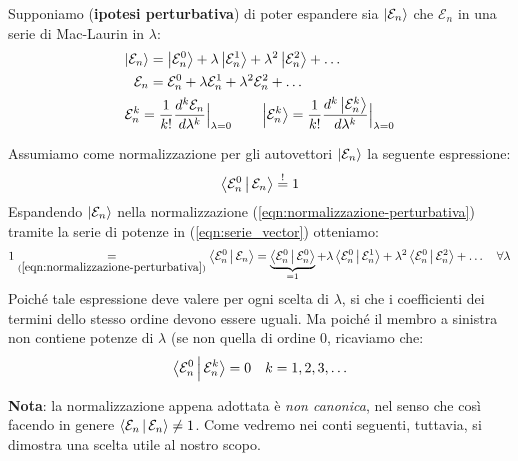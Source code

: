 \documentclass[../../FisicaTeorica.tex]{subfiles}
\begin{document}
Supponiamo (\textbf{ipotesi perturbativa}) di poter espandere sia $\Ket{\mathcal{E}_n}$ che $\mathcal{E}_n$ in una serie di Mac-Laurin in $\lambda$:
\begin{align}
\ket{\mathcal{E}_n} &= \ket{\mathcal{E}^0_n} + \lambda \ket{\mathcal{E}^1_n} + \lambda^2 \ket{\mathcal{E}^2_n} + \dots \label{eqn:serie_vector}\\
\mathcal{E}_n &= \mathcal{E}^0_n + \lambda \mathcal{E}^1_n + \lambda^2 \mathcal{E}^2_n +\dots \label{eqn:serie_evalue}\\
\nonumber
\mathcal{E}_n^k =\frac{1}{k!} \frac{d^k \mathcal{E}_n}{d\lambda^k}\Big|_{\lambda=0}\span \qquad \ket{\mathcal{E}_n^k}=\frac{1}{k!}\frac{d^k\ket{\mathcal{E}_n^k}}{d\lambda^k}\Big|_{\lambda=0}
\end{align}

Assumiamo come normalizzazione per gli autovettori $\Ket{\mathcal{E}_n}$ la seguente espressione:
\begin{align}
\Braket{\mathcal{E}^0_n|\mathcal{E}_n} \overset{!}{=} 1
\label{eqn:normalizzazione-perturbativa}
\end{align} 
Espandendo $\Ket{\mathcal{E}_n}$ nella normalizzazione (\ref{eqn:normalizzazione-perturbativa}) tramite la serie di potenze in (\ref{eqn:serie_vector}) otteniamo:
\begin{align*}
1 \underset{(\ref{eqn:normalizzazione-perturbativa})} =
\Braket{\mathcal{E}^0_n | \mathcal{E}_n} = 
\underbrace{\Braket{\mathcal{E}_n^0|\mathcal{E}_n^0}}_{=1}
+ \lambda \Braket{\mathcal{E}^0_n | \mathcal{E}^1_n} + \lambda^2 \Braket{\mathcal{E}_n^0|\mathcal{E}^2_n} + \dots \quad \forall \lambda
\end{align*}
Poiché tale espressione deve valere per ogni scelta di $\lambda$, si che i coefficienti dei termini dello stesso ordine devono essere uguali. Ma poiché il membro a sinistra non contiene potenze di $\lambda$ (se non quella di ordine $0$, ricaviamo che:
\begin{align*}
\Braket{\mathcal{E}_n^0|\mathcal{E}_n^k} = 0 \quad k=1,2,3,\dots
\end{align*}

\textbf{Nota}: la normalizzazione appena adottata è \textit{non canonica}, nel senso che così facendo in genere $\Braket{\mathcal{E}_n|\mathcal{E}_n}\neq1$. Come vedremo nei conti seguenti, tuttavia, si dimostra una scelta utile al nostro scopo.\\ 
\end{document}
